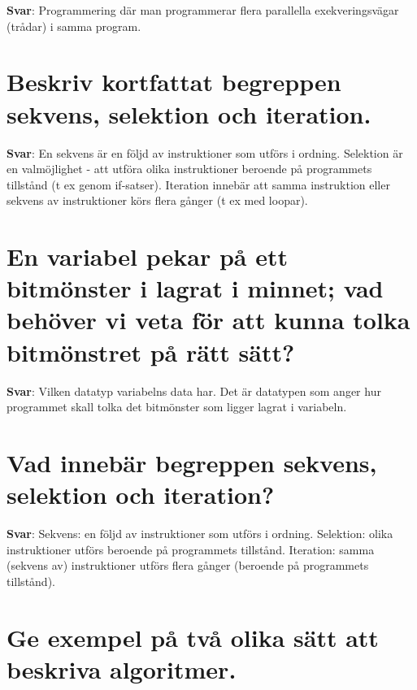 \documentclass[a4paper,11pt,oneside]{book}
\begin{document}
\begin{sloppypar}
\label{q:204:sa:sv:True}

\textbf{Svar}: Programmering d\"ar man programmerar flera parallella exekveringsv\"agar (tr\r{a}dar) i samma program.



\section{Beskriv kortfattat begreppen sekvens, selektion och iteration.}

\label{q:205:sa:sv:True}

\textbf{Svar}: En sekvens \"ar en f\"oljd av instruktioner som utf\"ors i ordning. Selektion \"ar en valm\"ojlighet - att utf\"ora olika instruktioner beroende p\r{a} programmets tillst\r{a}nd (t ex genom if-satser). Iteration inneb\"ar att samma instruktion eller sekvens av instruktioner k\"ors flera g\r{a}nger (t ex med loopar).



\section{En variabel pekar p\r{a} ett bitm\"onster i lagrat i minnet; vad beh\"over vi veta f\"or att kunna tolka bitm\"onstret p\r{a} r\"att s\"att?}

\label{q:206:sa:sv:True}

\textbf{Svar}: Vilken datatyp variabelns data har. Det \"ar datatypen som anger hur programmet skall tolka det bitm\"onster som ligger lagrat i variabeln.



\section{Vad inneb\"ar begreppen sekvens, selektion och iteration?}

\label{q:207:sa:sv:True}

\textbf{Svar}: Sekvens: en f\"oljd av instruktioner som utf\"ors i ordning. Selektion: olika instruktioner utf\"ors beroende p\r{a} programmets tillst\r{a}nd. Iteration: samma (sekvens av) instruktioner utf\"ors flera g\r{a}nger (beroende p\r{a} programmets tillst\r{a}nd).



\section{Ge exempel p\r{a} tv\r{a} olika s\"att att beskriva algoritmer.}


\end{sloppypar}
\end{document}
